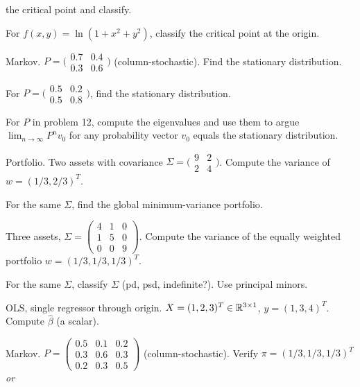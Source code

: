 \begin{problems}
        the critical point and classify.
  \item For $f(x, y) = \ln(1 + x^{2} + y^{2})$, classify the critical point
        at the origin.
  \item Markov.
        $P = \bigl(\begin{smallmatrix} 0.7 & 0.4 \\ 0.3 & 0.6 \end{smallmatrix}\bigr)$
        (column-stochastic). Find the stationary distribution.
  \item For
        $P = \bigl(\begin{smallmatrix} 0.5 & 0.2 \\ 0.5 & 0.8 \end{smallmatrix}\bigr)$,
        find the stationary distribution.
  \item For $P$ in problem 12, compute the eigenvalues and use them to argue
        $\lim_{n \to \infty} P^{n} v_{0}$ for any probability vector $v_{0}$
        equals the stationary distribution.
  \item Portfolio. Two assets with covariance
        $\Sigma = \bigl(\begin{smallmatrix} 9 & 2 \\ 2 & 4 \end{smallmatrix}\bigr)$.
        Compute the variance of $w = (1/3, 2/3)^{T}$.
  \item For the same $\Sigma$, find the global minimum-variance portfolio.
  \item Three assets,
        $\Sigma = \begin{pmatrix} 4 & 1 & 0 \\ 1 & 5 & 0 \\ 0 & 0 & 9 \end{pmatrix}$.
        Compute the variance of the equally weighted portfolio
        $w = (1/3, 1/3, 1/3)^{T}$.
  \item For the same $\Sigma$, classify $\Sigma$ (pd, psd, indefinite?). Use
        principal minors.
  \item OLS, single regressor through origin.
        $X = (1, 2, 3)^{T} \in \mathbb{R}^{3 \times 1}$, $y = (1, 3, 4)^{T}$.
        Compute $\hat{\beta}$ (a scalar).
  \item Markov.
        $P = \begin{pmatrix} 0.5 & 0.1 & 0.2 \\ 0.3 & 0.6 & 0.3 \\ 0.2 & 0.3 & 0.5 \end{pmatrix}$
        (column-stochastic). Verify $\pi = (1/3, 1/3, 1/3)^{T}$ \emph{or}

\end{problems}
